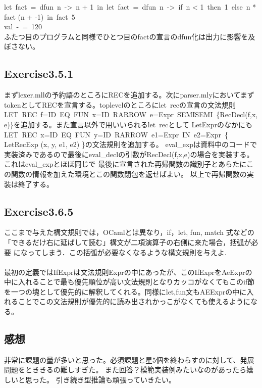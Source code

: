 \documentclass[a4paper,11pt,oneside,openany]{jsarticle}
\begin{document}
    let\ fact\ =\ dfun\ n\ ->\ n + 1\ in\ let\ fact\ =\ dfun\ n\ ->\ if\ n < 1\ then\ 1\ else\ n * fact (n + -1)\ in\ fact\ 5\\
    val\ -\ =\ 120\\
    ふたつ目のプログラムと同様でひとつ目のfactの宣言のdfun化は出力に影響を及ぼさない。




\subsection{Exercise3.5.1}
    まずlexer.mllの予約語のところにRECを追加する。次にparser.mlyにおいてまずtokenとしてRECを宣言する。toplevelのところにlet\ recの宣言の文法規則
    LET\ REC\ f=ID\ EQ\ FUN\ x=ID\ RARROW\ e=Expr\ SEMISEMI\ \{RecDecl(f,x,e)\}を追加する。また宣言以外で用いいられるlet\ recとして
    LetExprのなかにもLET\ REC\ x=ID\ EQ\ FUN\ y=ID\ RARROW\ e1=Expr\ IN\ e2=Expr\ \{ LetRecExp (x, y, e1, e2) \}の文法規則を追加する。
    eval\_expは資料中のコードで実装済みであるので最後にeval\_declの引数がRecDecl(f,x,e)の場合を実装する。これはeval\_expとほぼ同じで
    最後に宣言された再帰関数の識別子とあらたにこの関数の情報を加えた環境とこの関数閉包を返せばよい。
    以上で再帰関数の実装は終了する。

\subsection{Exercise3.6.5}
  ここまで与えた構文規則では，OCamlとは異なり，if，let, fun, match 式などの「できるだけ右に延ばして読む」構文が二項演算子の右側に来た場合，括弧が必要 になってしまう．この括弧が必要なくなるような構文規則を与えよ.\\\\
  最初の定義ではIfExprは文法規則Exprの中にあったが、このIfExprをAeExprの中に入れることで最も優先順位が高い文法規則となりカッコがなくてもこのif節を一つの塊として優先的に解釈してくれる。同様にlet,fun文もAEExprの中に入れることでこの文法規則が優先的に読み出されかっこがなくても使えるようになる。

\subsection{感想}
    非常に課題の量が多いと思った。必須課題と星5個を終わらすのに対して、発展問題をとききるの難しすぎた。
    また回答？模範実装例みたいなのがあったら嬉しいと思った。
    引き続き型推論も頑張っていきたい。
\end{document}

